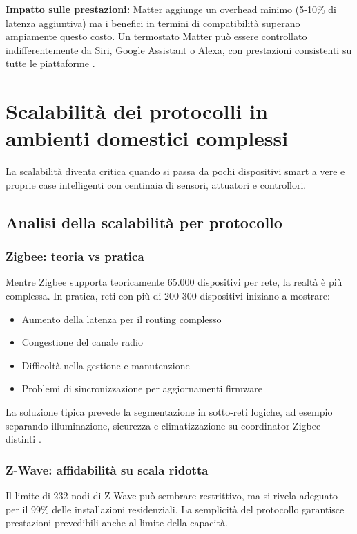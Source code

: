 \textbf{Impatto sulle prestazioni:}
Matter aggiunge un overhead minimo (5-10\% di latenza aggiuntiva) ma i benefici in termini di compatibilità superano ampiamente questo costo. Un termostato Matter può essere controllato indifferentemente da Siri, Google Assistant o Alexa, con prestazioni consistenti su tutte le piattaforme \cite{MatterWhitePaper}.

\section{Scalabilità dei protocolli in ambienti domestici complessi}

La scalabilità diventa critica quando si passa da pochi dispositivi smart a vere e proprie case intelligenti con centinaia di sensori, attuatori e controllori.

\subsection{Analisi della scalabilità per protocollo}

\subsubsection{Zigbee: teoria vs pratica}

Mentre Zigbee supporta teoricamente 65.000 dispositivi per rete, la realtà è più complessa. In pratica, reti con più di 200-300 dispositivi iniziano a mostrare:

\begin{itemize}
    \item Aumento della latenza per il routing complesso
    \item Congestione del canale radio
    \item Difficoltà nella gestione e manutenzione
    \item Problemi di sincronizzazione per aggiornamenti firmware
\end{itemize}

La soluzione tipica prevede la segmentazione in sotto-reti logiche, ad esempio separando illuminazione, sicurezza e climatizzazione su coordinator Zigbee distinti \cite{ZigbeeScalability}.

\subsubsection{Z-Wave: affidabilità su scala ridotta}

Il limite di 232 nodi di Z-Wave può sembrare restrittivo, ma si rivela adeguato per il 99\% delle installazioni residenziali. La semplicità del protocollo garantisce prestazioni prevedibili anche al limite della capacità.


